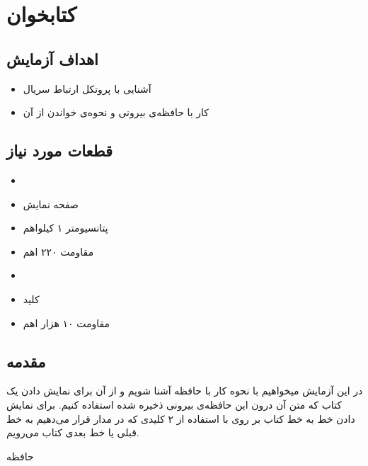 \section{کتابخوان}

\subsection{اهداف آزمایش}
\begin{itemize}
    \item آشنایی با پروتکل ارتباط سریال 
    \item کار با حافظه‌ی  بیرونی و نحوه‌ی خواندن از آن
\end{itemize}
\subsection{قطعات مورد نیاز}
\begin{itemize}
    \item {}
    \item صفحه نمایش 
    \item پتانسیومتر ۱ کیلواهم 
    \item مقاومت ۲۲۰ اهم
    \item {}
    \item کلید 
    \item مقاومت ۱۰ هزار اهم
\end{itemize}
\subsection{مقدمه}
در این آزمایش میخواهیم با نحوه کار با حافظه 
آشنا شویم و از آن برای نمایش دادن یک کتاب که متن آن درون این حافظه‌ی بیرونی ذخیره شده استفاده کنیم. برای نمایش دادن خط به خط کتاب بر روی
با استفاده از ۲ کلیدی که در مدار قرار می‌دهیم به خط قبلی یا خط بعدی کتاب می‌رویم.

\newline
\begin{nas}حافظه \end{nas}
\newline

